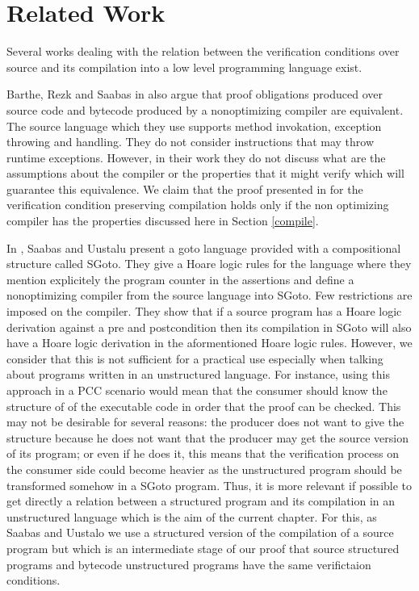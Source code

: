 \section{Related Work}\label{pog:relWork}


Several works dealing with the relation between the 
verification conditions over source and its compilation into a low  level  programming  language exist.

Barthe, Rezk and Saabas in \cite{gta05:fast} also argue that proof obligations produced
over source code and
bytecode produced by a nonoptimizing compiler   are equivalent.
The source language which they use supports method invokation, exception throwing and handling. 
They do not consider instructions that may throw
runtime exceptions. 
 However, in their work they do not discuss  what are the  assumptions about the compiler 
or the  properties that it might verify  which will guarantee this equivalence.
 We claim that the proof presented in \cite{gta05:fast} for
 the verification condition preserving compilation holds only if the non optimizing 
 compiler has the properties discussed here in Section \ref{compile}.


In \cite{SU05CNS}, Saabas and Uustalu present a goto language provided with a compositional structure called SGoto.
They give a Hoare logic rules for the language where they mention explicitely the program counter in the assertions and define a nonoptimizing 
compiler from the source language into SGoto. Few  restrictions are imposed on the compiler. 
They show that if a source program has a Hoare logic derivation
 against a pre and postcondition then its compilation in SGoto will also have a Hoare
 logic derivation in the aformentioned Hoare logic rules. However, we consider that this is not sufficient for a practical use especially when 
talking about programs written in an unstructured language. 
For instance, using this approach in a PCC scenario would mean that the consumer should know the structure of 
of the  executable code in order that the proof can be checked. This may not be desirable for several reasons:
the producer does not want to  give the structure because he does not want that the producer may get the source version of its program; 
or even if he does it, this means that the verification process on the consumer side could become heavier as the unstructured program
 should be transformed somehow in a SGoto program.
 Thus, it is more relevant if possible to get directly  a relation between a structured program 
and its compilation in an  unstructured  language which is the aim of the current chapter.
 For this, as Saabas and Uustalo we use a  structured version of the compilation of a source program 
but which is an intermediate stage of our proof that source structured programs and bytecode unstructured 
programs have the same verifictaion conditions.

